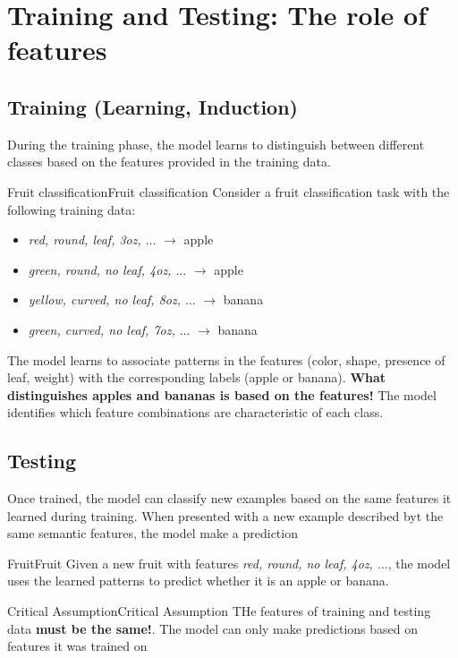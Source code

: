 \documentclass[a4paper]{article}
\theoremstyle{definition}
\begin{document}
\section{Training and Testing: The role of features}
\subsection{Training (Learning, Induction)}
During the training phase, the model learns to distinguish between different classes based on the features provided in the training 
data.
\begin{example}{Fruit classification}{Fruit classification}
Consider a fruit classification task with the following training data:
\begin{itemize}
    \item \textit{red, round, leaf, 3oz, \( \ldots \)} \( \rightarrow \) apple 
    \item \textit{green, round, no leaf, 4oz, \( \ldots \)} \( \rightarrow \) apple 
    \item \textit{yellow, curved, no leaf, 8oz, \( \ldots \)} \( \rightarrow \) banana 
    \item \textit{green, curved, no leaf, 7oz, \( \ldots \)} \( \rightarrow \) banana
\end{itemize}
The model learns to associate patterns in the features (color, shape, presence of leaf, weight) with the corresponding labels (apple or banana).
\textbf{What distinguishes apples and bananas is based on the features!} The model identifies which feature combinations 
are characteristic of each class.
\end{example}
\subsection{Testing}
Once trained, the model can classify new examples based on the same features it learned during training.
When presented with a new example described byt the same semantic features, the model make a prediction 
\begin{example}{Fruit}{Fruit}
Given a new fruit with features \textit{red, round, no leaf, 4oz, \( \ldots \)}, the model uses the 
learned patterns to predict whether it is an apple or banana.
\end{example}
\begin{theorem}{Critical Assumption}{Critical Assumption}
THe features of training and testing data \textbf{must be the same!}. The model can only make 
predictions based on features it was trained on
\end{theorem}
\end{document}
